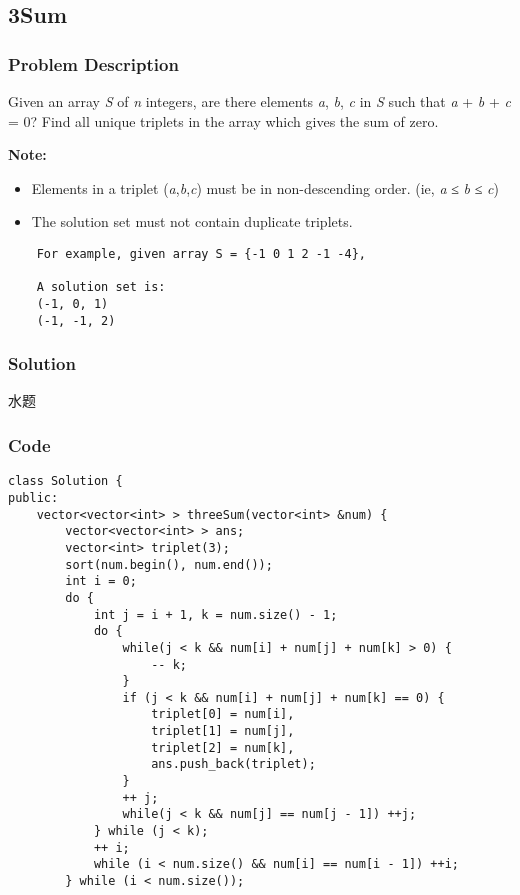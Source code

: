 \documentclass[courier]{article}
\begin{document}
\begin{CJK*}{UTF8}{gkai}
\subsection{ 3Sum }

\subsubsection*{Problem Description}
Given an array \emph{S} of \emph{n} integers, are there elements \emph{a}, \emph{b}, \emph{c} in \emph{S} such that \emph{a} + \emph{b} + \emph{c} = 0? Find all unique triplets in the array which gives the sum of zero.

\textbf{Note:}



\begin{itemize}
\item Elements in a triplet (\emph{a},\emph{b},\emph{c}) must be in non-descending order. (ie, \emph{a} ≤ \emph{b} ≤ \emph{c})
\item The solution set must not contain duplicate triplets.
\end{itemize}

\begin{verbatim}
    For example, given array S = {-1 0 1 2 -1 -4},

    A solution set is:
    (-1, 0, 1)
    (-1, -1, 2)
\end{verbatim}


\subsubsection*{Solution}
水题

\subsubsection*{Code}
\begin{lstlisting}
class Solution {
public:
    vector<vector<int> > threeSum(vector<int> &num) {
        vector<vector<int> > ans;
        vector<int> triplet(3);
        sort(num.begin(), num.end());
        int i = 0;
        do {
            int j = i + 1, k = num.size() - 1;
            do {
                while(j < k && num[i] + num[j] + num[k] > 0) {
                    -- k;
                } 
                if (j < k && num[i] + num[j] + num[k] == 0) {
                    triplet[0] = num[i], 
                    triplet[1] = num[j], 
                    triplet[2] = num[k], 
                    ans.push_back(triplet);
                }
                ++ j;
                while(j < k && num[j] == num[j - 1]) ++j;
            } while (j < k);
            ++ i;
            while (i < num.size() && num[i] == num[i - 1]) ++i;
        } while (i < num.size());
        

\end{lstlisting}
\end{CJK*}
\end{document}
